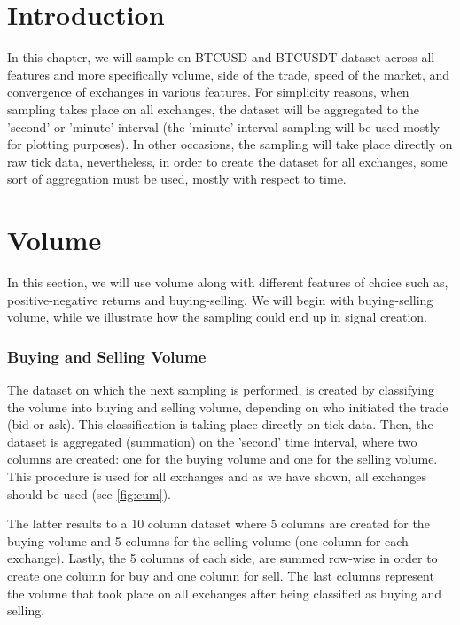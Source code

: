 
\section{Introduction}

In this chapter, we will sample on BTCUSD and BTCUSDT dataset across all features and more specifically volume, side of the trade, speed of the market, and convergence of exchanges in various features. For simplicity reasons, when sampling takes place on all exchanges, the dataset will be aggregated to the 'second' or 'minute' interval (the 'minute' interval sampling will be used mostly for plotting purposes). In other occasions, the sampling will take place directly on raw tick data, nevertheless, in order to create the dataset for all exchanges, some sort of aggregation must be used, mostly with respect to time.

\section{Volume}

In this section, we will use volume along with different features of choice such as, positive-negative returns and buying-selling. We will begin with buying-selling volume, while we illustrate how the sampling could end up in signal creation.

\subsubsection{Buying and Selling Volume}

The dataset on which the next sampling is performed, is created by classifying the volume into buying and selling volume, depending on who initiated the trade (bid or ask). This classification is taking place directly on tick data. Then, the dataset is aggregated (summation) on the 'second' time interval, where two columns are created: one for the buying volume and one for the selling volume. This procedure is used for all exchanges and as we have shown, all exchanges should be used (see \ref{fig:cum}). 

The latter results to a 10 column dataset where 5 columns are created for the buying volume and 5 columns for the selling volume (one column for each exchange). Lastly, the 5 columns of each side, are summed row-wise in order to create one column for buy and one column for sell. The last columns represent the volume that took place on all exchanges after being classified as buying and selling.

